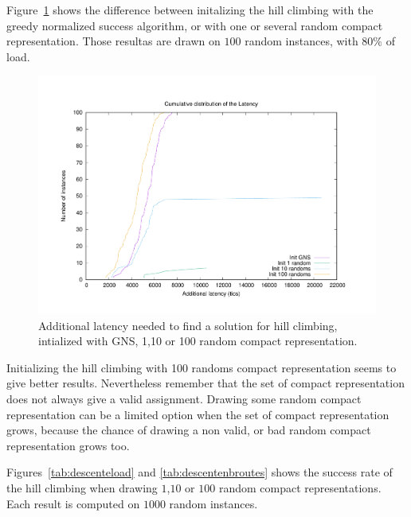 \documentclass[english]{article}
\begin{document}
Figure~\ref{fig:descente07} shows the difference between initalizing the hill climbing with the greedy normalized success algorithm, or with one or several random compact representation. Those resultas are drawn on $100$ random instances, with $80\%$ of load.
\begin{figure}[h]
	\centering
	\includegraphics[scale=0.3]{descente07}
\caption{ Additional latency needed to find a solution for hill climbing, intialized with GNS, 1,10 or 100 random compact representation.}
\label{fig:descente07}
\end{figure}
Initializing the hill climbing with 100 randoms compact representation seems to give better results. Nevertheless remember that the set of compact representation does not always give a valid assignment. Drawing some random compact representation can be a limited option when the set of compact representation grows, because the chance of drawing a non valid, or bad random compact representation grows too.

Figures~\ref{tab:descenteload} and \ref{tab:descentenbroutes} shows the success rate of the hill climbing when drawing $1$,$10$ or $100$ random compact representations. Each result is computed on $1000$ random instances.
\end{document}
